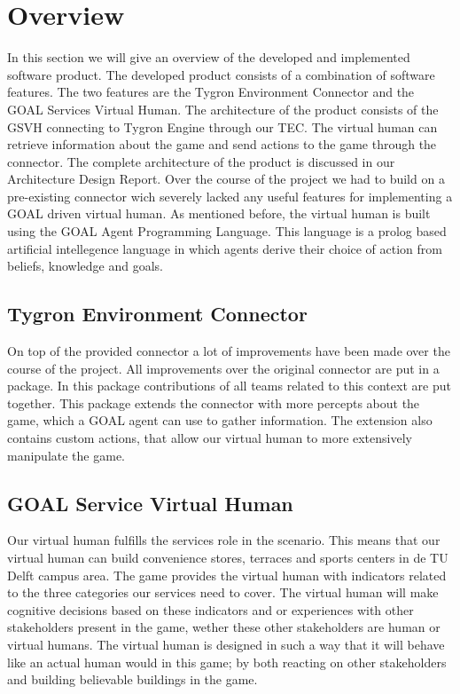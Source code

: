 \section{Overview}
In this section we will give an overview of the developed and implemented software product. The developed product consists of a combination of software features. The two features are the Tygron Environment Connector and the GOAL Services Virtual Human. The architecture of the product consists of the GSVH connecting to Tygron Engine through our TEC. The virtual human can retrieve information about the game and send actions to the game through the connector. The complete architecture of the product is discussed in our Architecture Design Report\cite{CTD16}. Over the course of the project we had to build on a pre-existing connector wich severely lacked any useful features for implementing a GOAL driven virtual human. As mentioned before, the virtual human is built using the GOAL Agent Programming Language\cite{GOAL16}. This language is a prolog based artificial intellegence language in which agents derive their choice of action from beliefs, knowledge and goals.

\subsection{Tygron Environment Connector}
On top of the provided connector a lot of improvements have been made over the course of the project. All improvements over the original connector are put in a package. In this package contributions of all teams related to this context are put together. This package extends the connector with more percepts about the game, which a GOAL agent can use to gather information. The extension also contains custom actions, that allow our virtual human to more extensively manipulate the game. 

\subsection{GOAL Service Virtual Human}
Our virtual human fulfills the services role in the scenario. This means that our virtual human can build convenience stores, terraces and sports centers in de TU Delft campus area. The game provides the virtual human with indicators related to the three categories our services need to cover. The virtual human will make cognitive decisions based on these indicators and or experiences with other stakeholders present in the game, wether these other stakeholders are human or virtual humans. The virtual human is designed in such a way that it will behave like an actual human would in this game; by both reacting on other stakeholders and building believable buildings in the game.

\newpage